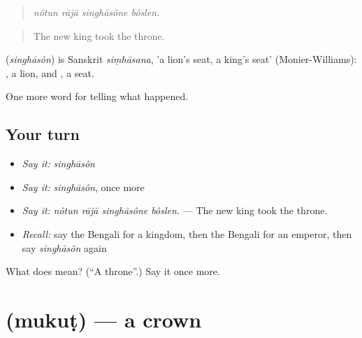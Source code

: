 \begin{quote}
   
\end{quote}

\begin{quote}
\emph{nôtun rājā singhāsône bôslen.}
\end{quote}

\begin{quote}
The new king took the throne.
\end{quote}

\begin{cousinweb}
\textbf{} (\emph{singhāsôn}) is Sanskrit \emph{siṃhāsana}, 'a lion's seat, a king's seat' (Monier-Williams): \textbf{}, a lion, and \textbf{}, a seat.
\end{cousinweb}

\begin{grammarlens}[title={What you've built}]
One more word for telling what happened.
\end{grammarlens}

\subsection*{Your turn}
\begin{itemize}
\raggedright
  \item \emph{Say it:} \emph{singhāsôn}
  \item \emph{Say it:} \emph{singhāsôn}, once more
  \item \emph{Say it:} \emph{nôtun rājā singhāsône bôslen.} — The new king took the throne.
  \item \emph{Recall:} say the Bengali for a kingdom, then the Bengali for an emperor, then say \emph{singhāsôn} again
\end{itemize}

\begin{tcolorbox}[breakable,colback=teal!4,colframe=teal!35!black,title={Before you move on}]
What does  mean? (\textquotedblleft{}A throne\textquotedblright{}.) Say it once more.
\end{tcolorbox}
\section[\texorpdfstring{\bn{মুকুট} (mukuṭ)}{মুকুট (mukuṭ)}]{ (mukuṭ) — a crown}

\label{lesson:BN-C313-mukut}



